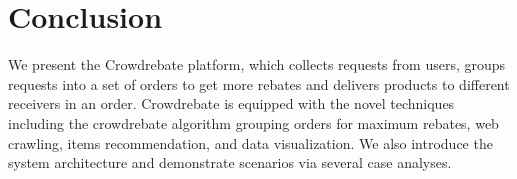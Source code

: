 \section{Conclusion}
\label{sec:conclusion}

We present the Crowdrebate platform, which collects requests from users, groups requests into a set of orders to get more rebates and delivers products to different receivers in an order. Crowdrebate is equipped with the novel techniques including the crowdrebate algorithm grouping orders for maximum rebates, web crawling, items recommendation, and data visualization. We also introduce the system architecture and demonstrate scenarios via several case analyses. 
 
